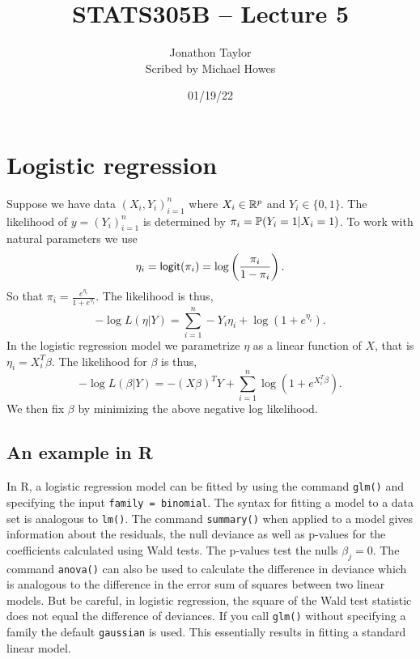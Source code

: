 




\title{STATS305B -- Lecture 5}
\author{Jonathon Taylor\\ Scribed by Michael Howes}
\date{01/19/22}

\pagestyle{fancy}
\fancyhf{}


\maketitle
\tableofcontents 

\section{Logistic regression}
Suppose we have data $(X_i,Y_i)_{i=1}^n$ where $X_i \in {\mathbb R}^p$ and $Y_i \in \{0,1\}$. The likelihood of $y = (Y_i)_{i=1}^n$ is determined by $\pi_i = {\mathbb{P}}(Y_i=1|X_i=1)$. To work with natural parameters we use \[\eta_i = \mathsf{logit}(\pi_i) = \log\left(\frac{\pi_i}{1-\pi_i}\right).\]
So that $\pi_i = \frac{e^{\eta_i}}{1+e^{\eta_i}}$.  The likelihood is thus,
\[-\log L(\eta|Y) = \sum_{i=1}^n-Y_i\eta_i+\log(1+e^{\eta_i}).\]
In the logistic regression model we parametrize $\eta$ as a linear function of $X$, that is $\eta_i =X_i^T\beta$. The likelihood for $\beta$ is thus,
\[-\log L(\beta|Y)  = -(X\beta)^TY+\sum_{i=1}^n \log(1+e^{X_i^T\beta}).\]
We then fix $\beta$ by minimizing the above negative log likelihood. 
\subsection{An example in R}
In R, a logistic regression model can be fitted by using the command \texttt{glm()} and specifying the input \texttt{family   = binomial}. The syntax for  fitting a model to a data set is analogous to \texttt{lm()}. The command \texttt{summary()} when applied to a model gives information about the residuals, the null deviance as well as p-values for the coefficients calculated using Wald tests. The p-values test the nulls $\beta_j = 0$. The command \texttt{anova()} can also be used to calculate the difference in deviance which is analogous to the difference in the error sum of squares between two linear models. But be careful, in logistic regression, the square of the Wald test statistic does not equal the difference of deviances. If you call \texttt{glm()} without specifying a family the default \texttt{gaussian} is used. This essentially results in fitting a standard linear model.
